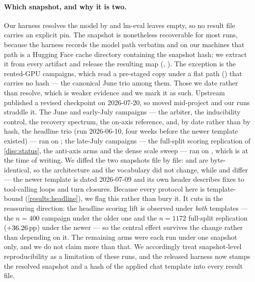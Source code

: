 \paragraph{Which snapshot, and why it is two.} Our harness resolves the model by
 and lm-eval leaves  empty, so no result file
carries an explicit pin. The snapshot is nonetheless recoverable for most runs,
because the harness records the model path verbatim and on our machines that path is a
Hugging Face cache directory containing the snapshot hash; we extract it from every
artifact and release the resulting map (,
). The exception is the rented-GPU campaigns, which
read a pre-staged copy under a flat path () that
carries no hash --- the canonical June trio among them. Those we date rather than
resolve, which is weaker evidence and we mark it as such. Upstream published a revised
checkpoint on 2026-07-20, so  moved mid-project and our runs straddle it.
The June and early-July campaigns --- the arbiter, the inducibility control, the
recovery spectrum, the on-axis reference, and, by date rather than by hash, the
headline trio (run 2026-06-10, four weeks before the newer template existed) --- ran on
; the late-July campaigns --- the
full-split scoring replication of \cref{disc:status}, the anti-axis arms and the
dense scale sweep --- ran on , which
is  at the time of writing. We diffed the two snapshots file by file:
 and  are byte-identical, so the architecture
and the vocabulary did not change, while  and
 differ --- the newer template is dated 2026-07-09 and
its own header describes fixes to tool-calling loops and turn closures. Because every
protocol here is template-bound (\cref{results:headline}), we flag this rather than
bury it. It cuts in the reassuring direction: the headline scoring lift is observed
under \emph{both} templates --- the $n{=}400$ campaign under the older one and the
$n{=}1172$ full-split replication ($+36.26\,\mathrm{pp}$) under the newer --- so the central
effect survives the change rather than depending on it. The remaining arms were each
run under one snapshot only, and we do not claim more than that. We accordingly treat
snapshot-level reproducibility as a limitation of these runs, and the released
harness now stamps the resolved snapshot and a hash of the applied chat template into
every result file.

